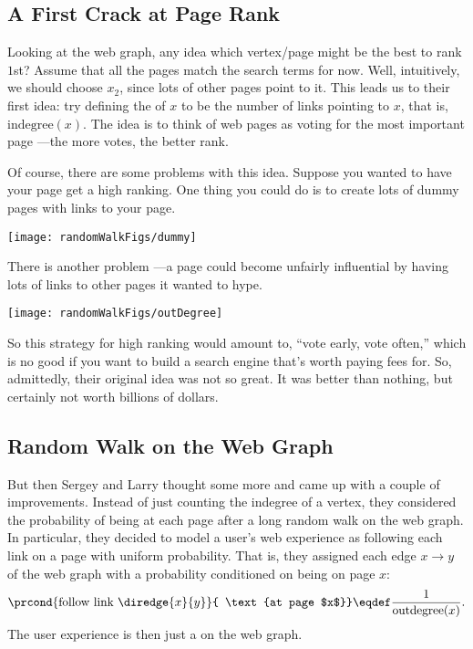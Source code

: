\subsection{A First Crack at Page Rank}

Looking at the web graph, any idea which vertex/page might be the best to
rank $1$st?  Assume that all the pages match the search terms for now.
Well, intuitively, we should choose $x_2$, since lots of other pages point
to it.  This leads us to their first idea: try defining the  of $x$ to be the number of links pointing to $x$, that is,
$\text{indegree}(x)$.  The idea is to think of web pages as voting for the
most important page ---the more votes, the better rank.

Of course, there are some problems with this idea.  Suppose you wanted
to have your page get a high ranking.  One thing you could do is to
create lots of dummy pages with links to your page.

\texttt{[image: randomWalkFigs/dummy]}

There is another problem ---a page could become unfairly influential by
having lots of links to other pages it wanted to hype.

\texttt{[image: randomWalkFigs/outDegree]}

So this strategy for high ranking would amount to, ``vote early, vote
often,'' which is no good if you want to build a search engine that's
worth paying fees for.  So, admittedly, their original idea was not so
great.  It was better than nothing, but certainly not worth billions of
dollars.

\subsection{Random Walk on the Web Graph}

But then Sergey and Larry thought some more and came up with a couple of
improvements.  Instead of just counting the indegree of a vertex, they
considered the probability of being at each page after a long random walk
on the web graph.  In particular, they decided to model a user's web
experience as following each link on a page with uniform probability.
That is, they assigned each edge $x \rightarrow y$ of the web graph with a
probability conditioned on being on page $x$:
\[
\prcond{\text{follow link}\ \diredge{x}{y}}{ \text{at page $x$}} \eqdef
\frac{1}{\text{outdegree}(x)}.
\]
The user experience is then just a  on the web graph.

